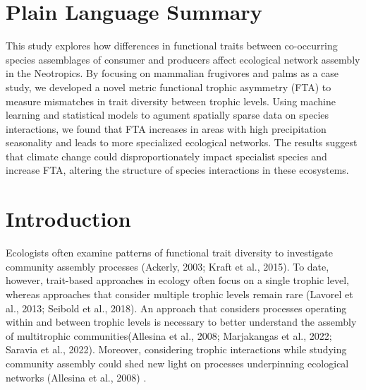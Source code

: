 \documentclass[
]{agujournal2019}
\begin{document}
\section*{Plain Language Summary}
This study explores how differences in functional traits between
co-occurring species assemblages of consumer and producers affect
ecological network assembly in the Neotropics. By focusing on mammalian
frugivores and palms as a case study, we developed a novel metric
functional trophic asymmetry (FTA) to measure mismatches in trait
diversity between trophic levels. Using machine learning and statistical
models to agument spatially sparse data on species interactions, we
found that FTA increases in areas with high precipitation seasonality
and leads to more specialized ecological networks. The results suggest
that climate change could disproportionately impact specialist species
and increase FTA, altering the structure of species interactions in
these ecosystems.




\section{Introduction}\label{introduction}

Ecologists often examine patterns of functional trait diversity to
investigate community assembly processes (Ackerly, 2003; Kraft et al.,
2015). To date, however, trait-based approaches in ecology often focus
on a single trophic level, whereas approaches that consider multiple
trophic levels remain rare (Lavorel et al., 2013; Seibold et al., 2018).
An approach that considers processes operating within and between
trophic levels is necessary to better understand the assembly of
multitrophic communities(Allesina et al., 2008; Marjakangas et al.,
2022; Saravia et al., 2022). Moreover, considering trophic interactions
while studying community assembly could shed new light on processes
underpinning ecological networks (Allesina et al., 2008) .
\end{document}
